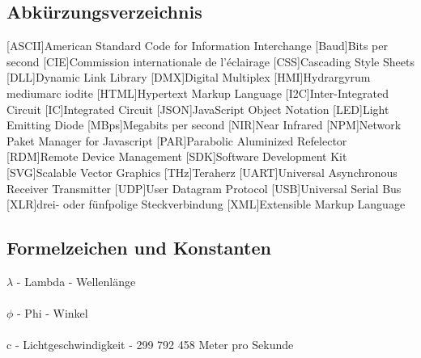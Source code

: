 \documentclass[11pt]{scrartcl}
\begin{document}
\subsection{Abkürzungsverzeichnis}
\begin{acronym}
    [ASCII]{American Standard Code for Information Interchange}
    [Baud]{Bits per second}
    [CIE]{Commission internationale de l’éclairage}
    [CSS]{Cascading Style Sheets}
    [DLL]{Dynamic Link Library}
    [DMX]{Digital Multiplex}
    [HMI]{Hydrargyrum mediumarc iodite}
    [HTML]{Hypertext Markup Language}
    [I2C]{Inter-Integrated Circuit}
    [IC]{Integrated Circuit}
    [JSON]{JavaScript Object Notation}
    [LED]{Light Emitting Diode}
    [MBps]{Megabits per second}
    [NIR]{Near Infrared}
    [NPM]{Network Paket Manager for Javascript}
    [PAR]{Parabolic Aluminized Refelector}
    [RDM]{Remote Device Management}
    [SDK]{Software Development Kit}
    [SVG]{Scalable Vector Graphics}
    [THz]{Teraherz}
    [UART]{Universal Asynchronous Receiver Transmitter}
    [UDP]{User Datagram Protocol}
    [USB]{Universal Serial Bus}
    [XLR]{drei- oder fünfpolige Steckverbindung}
    [XML]{Extensible Markup Language}
\end{acronym}
\clearpage

\subsection{Formelzeichen und Konstanten}
$\lambda$ - Lambda - Wellenlänge\\
\\
$\phi$ - Phi - Winkel\\
\\
c - Lichtgeschwindigkeit - 299 792 458 Meter pro Sekunde
\clearpage
\end{document}
